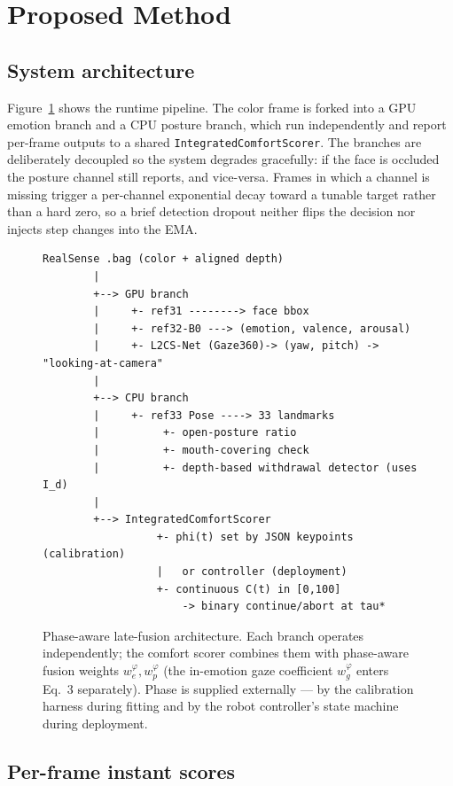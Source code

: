 \documentclass{article}
\newcommand{\code}[1]{\texttt{\small #1}}
\begin{document}
\section{Proposed Method}

\subsection{System architecture}

Figure~\ref{fig:arch} shows the runtime pipeline. The color frame is forked into a GPU emotion branch and a CPU posture branch, which run independently and report per-frame outputs to a shared \code{IntegratedComfortScorer}. The branches are deliberately decoupled so the system degrades gracefully: if the face is occluded the posture channel still reports, and vice-versa. Frames in which a channel is missing trigger a per-channel exponential decay toward a tunable target rather than a hard zero, so a brief detection dropout neither flips the decision nor injects step changes into the EMA.

\begin{figure}[t]
\centering
\begin{lstlisting}
RealSense .bag (color + aligned depth)
        |
        +--> GPU branch
        |     +- ref31 --------> face bbox
        |     +- ref32-B0 ---> (emotion, valence, arousal)
        |     +- L2CS-Net (Gaze360)-> (yaw, pitch) -> "looking-at-camera"
        |
        +--> CPU branch
        |     +- ref33 Pose ----> 33 landmarks
        |          +- open-posture ratio
        |          +- mouth-covering check
        |          +- depth-based withdrawal detector (uses I_d)
        |
        +--> IntegratedComfortScorer
                  +- phi(t) set by JSON keypoints (calibration)
                  |   or controller (deployment)
                  +- continuous C(t) in [0,100]
                      -> binary continue/abort at tau*
\end{lstlisting}
\caption{Phase-aware late-fusion architecture. Each branch operates independently; the comfort scorer combines them with phase-aware fusion weights $w_e^\varphi, w_p^\varphi$ (the in-emotion gaze coefficient $w_g^\varphi$ enters Eq.~3 separately). Phase is supplied externally --- by the calibration harness during fitting and by the robot controller's state machine during deployment.}
\label{fig:arch}
\end{figure}

\subsection{Per-frame instant scores}
\label{sec:instant}
\end{document}
